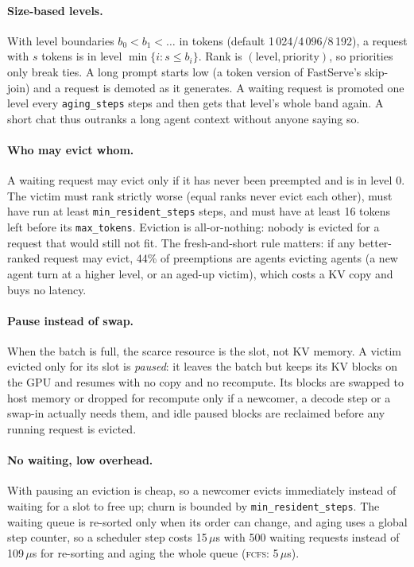 \documentclass[11pt]{article}
\newcommand{\fcfs}{\textsc{fcfs}}
\begin{document}
\paragraph{Size-based levels.} With level boundaries $b_0 < b_1 < \dots$ in tokens (default
1\,024/4\,096/8\,192), a request with $s$ tokens is in level $\min\{i : s \le b_i\}$. Rank is
$(\text{level}, \text{priority})$, so priorities only break ties. A long prompt starts low (a token
version of FastServe's skip-join) and a request is demoted as it generates. A waiting request is
promoted one level every \texttt{aging\_steps} steps and then gets that level's whole band again.
A short chat thus outranks a long agent context without anyone saying so.

\paragraph{Who may evict whom.} A waiting request may evict only if it has never been preempted and
is in level 0. The victim must rank strictly worse (equal ranks never evict each other), must have
run at least \texttt{min\_resident\_steps} steps, and must have at least 16 tokens left before its
\texttt{max\_tokens}. Eviction is all-or-nothing: nobody is evicted for a request that would still not
fit. The fresh-and-short rule matters: if any better-ranked request may evict, 44\% of preemptions
are agents evicting agents (a new agent turn at a higher level, or an aged-up victim), which costs a
KV copy and buys no latency.

\paragraph{Pause instead of swap.} When the batch is full, the scarce resource is the slot, not KV
memory. A victim evicted only for its slot is \emph{paused}: it leaves the batch but keeps its KV
blocks on the GPU and resumes with no copy and no recompute. Its blocks are swapped to host memory or
dropped for recompute only if a newcomer, a decode step or a swap-in actually needs them, and idle
paused blocks are reclaimed before any running request is evicted.

\paragraph{No waiting, low overhead.} With pausing an eviction is cheap, so a newcomer evicts
immediately instead of waiting for a slot to free up; churn is bounded by
\texttt{min\_resident\_steps}. The waiting queue is re-sorted only when its order can change, and
aging uses a global step counter, so a scheduler step costs 15\,$\mu$s with 500 waiting requests
instead of 109\,$\mu$s for re-sorting and aging the whole queue (\fcfs{}: 5\,$\mu$s).
\end{document}
